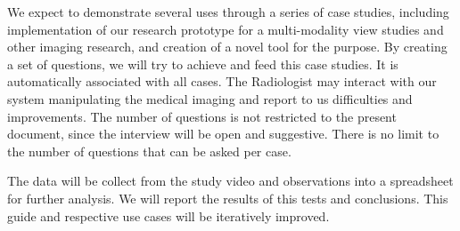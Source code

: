 \hfill


We expect to demonstrate several uses through a series of case studies, including implementation of our research prototype for a multi-modality view studies and other imaging research, and creation of a novel tool for the purpose. By creating a set of questions, we will try to achieve and feed this case studies. It is automatically associated with all cases. The Radiologist may interact with our system manipulating the medical imaging and report to us difficulties and improvements. The number of questions is not restricted to the present document, since the interview will be open and suggestive. There is no limit to the number of questions that can be asked per case.

The data will be collect from the study video and observations into a spreadsheet for further analysis. We will report the results of this tests and conclusions. This guide and respective use cases will be iteratively improved.











